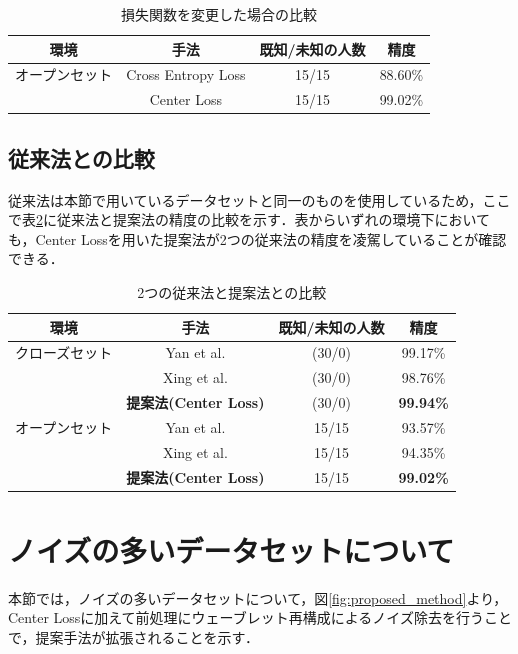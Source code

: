 \begin{table}[H]
\caption{損失関数を変更した場合の比較}
\centering
\begin{tabular}{cccc}
\hline
環境 & 手法 & 既知/未知の人数 & 精度 \\
\hline
オープンセット & Cross Entropy Loss & 15/15 & 88.60\% \\
& Center Loss & 15/15 & 99.02\% \\
\hline
\end{tabular}
\label{table:comparison_loss}
\end{table}

\subsection{従来法との比較}
従来法\cite{paper:HeartSignature, paper:Xing}は本節で用いているデータセットと同一のものを使用しているため，ここで表\ref{table:comparison30}に従来法と提案法の精度の比較を示す．表からいずれの環境下においても，Center Lossを用いた提案法が2つの従来法の精度を凌駕していることが確認できる．

\begin{table}[H]
  \caption{2つの従来法と提案法との比較}
  \centering
  \begin{tabular}{cccc}
  \hline
  環境 & 手法 & 既知/未知の人数 & 精度 \\
  \hline
  クローズセット & Yan et al.\cite{paper:HeartSignature} & (30/0) & 99.17\% \\
  & Xing et al.\cite{paper:Xing} & (30/0) & 98.76\% \\
  & \textbf{提案法(Center Loss)} & (30/0) & \textbf{99.94\%} \\
  \hline
  オープンセット & Yan et al.\cite{paper:HeartSignature} & 15/15 & 93.57\% \\
  & Xing et al.\cite{paper:Xing} & 15/15 & 94.35\% \\
  & \textbf{提案法(Center Loss)} & 15/15 & \textbf{99.02\%} \\
  \hline
  \end{tabular}
  \label{table:comparison30}
\end{table}


\section{ノイズの多いデータセットについて}
本節では，ノイズの多いデータセットについて，図\ref{fig:proposed_method}より，Center Lossに加えて前処理にウェーブレット再構成によるノイズ除去を行うことで，提案手法が拡張されることを示す．
